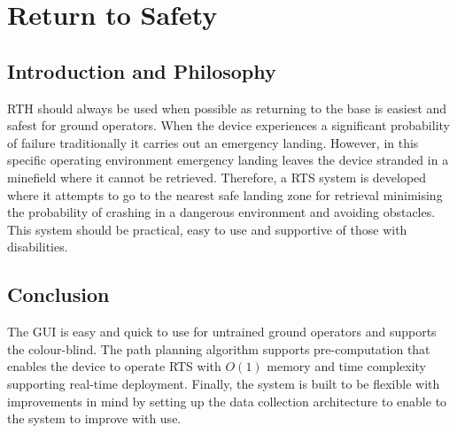 \newpage
{}
\section{Return to Safety} \label{Return to Safety}

\subsection{Introduction and Philosophy}\label{sub_section:tgt_RTS_intro}
\gls{RTH} should always be used when possible as returning to the base is easiest and safest for ground operators. When the device experiences a significant probability of failure traditionally it carries out an emergency landing. However, in this specific operating environment emergency landing leaves the device stranded in a minefield where it cannot be retrieved. Therefore, a \gls{RTS} system is developed where it attempts to go to the nearest safe landing zone for retrieval minimising the probability of crashing in a dangerous environment and avoiding obstacles. This system should be practical, easy to use and supportive of those with disabilities.





\subsection{Conclusion}
The \gls{GUI} is easy and quick to use for untrained ground operators and supports the colour-blind. The path planning algorithm supports pre-computation that enables the device to operate \gls{RTS} with $O(1)$ memory and time complexity supporting real-time deployment. Finally, the system is built to be flexible with improvements in mind by setting up the data collection architecture to enable to the system to improve with use. 